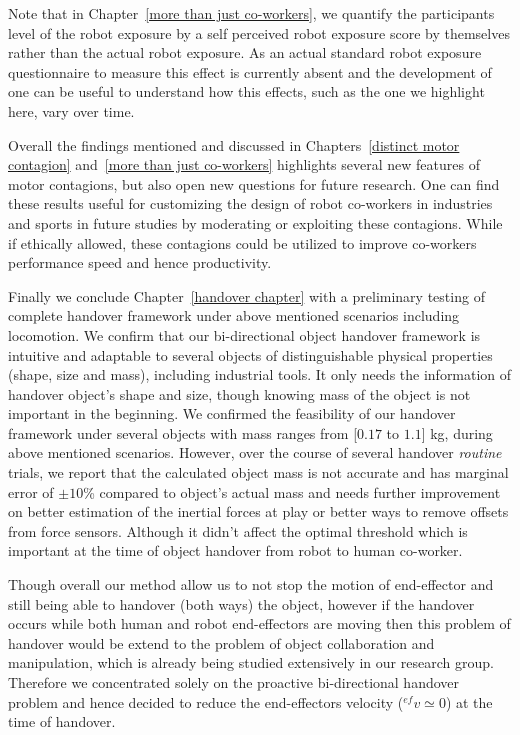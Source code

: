 Note that in Chapter~\ref{more than just co-workers}, we quantify the participants level of the robot exposure by a self perceived robot exposure score by themselves rather than the actual robot exposure. As an actual standard robot exposure questionnaire to measure this effect is currently absent and the development of one can be useful to understand how this effects, such as the one we highlight here, vary over time.

Overall the findings mentioned and discussed in Chapters~\ref{distinct motor contagion} and~\ref{more than just co-workers} highlights several new features of motor contagions, but also open new questions for future research. One can find these results useful for customizing the design of robot co-workers in industries and sports in future studies by moderating or exploiting these contagions. While if ethically allowed, these contagions could be utilized to improve co-workers performance speed and hence productivity.


Finally we conclude Chapter~\ref{handover chapter} with a preliminary testing of complete handover framework under above mentioned scenarios including locomotion. We confirm that our bi-directional object handover framework is intuitive and adaptable to several objects of distinguishable physical properties (shape, size and mass), including  industrial tools. It only needs the information of handover object's shape and size, though knowing mass of the object is not important in the beginning. We confirmed the feasibility of our handover framework under several objects with mass ranges from [$0.17$ to $1.1$] kg, during above mentioned scenarios. However, over the course of several handover \textit{routine} trials, we report that the calculated object mass is not accurate and has marginal error of $ \pm10 $\% compared to object's actual mass and needs further improvement on better estimation of the inertial forces at play or  better ways to remove offsets from force sensors. Although it didn't affect the optimal threshold which is important at the time of object handover from robot to human co-worker.

Though overall our method allow us to not stop the motion of end-effector and still being able to handover (both ways) the object, however if the handover occurs while both human and robot end-effectors are moving then this problem of handover would be extend to the problem of object collaboration and manipulation, which is already being studied extensively in our research group. Therefore we concentrated solely on the proactive bi-directional handover problem and hence decided to reduce the end-effectors velocity (${}^{ef}v\simeq0$) at the time of handover. 

